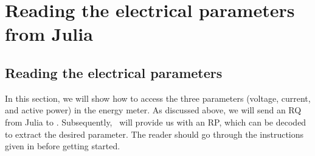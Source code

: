 

\section{Reading the electrical parameters from Julia}
\subsection{Reading the electrical parameters}
In this section, we will show how to access the three parameters (voltage, current, and active power) in the energy meter. As discussed above, we will send an RQ from Julia to \arduino. Subsequently, \arduino\ will provide us with an RP, which can be decoded to extract the desired parameter. The reader should go through the instructions given in  before getting started. 

